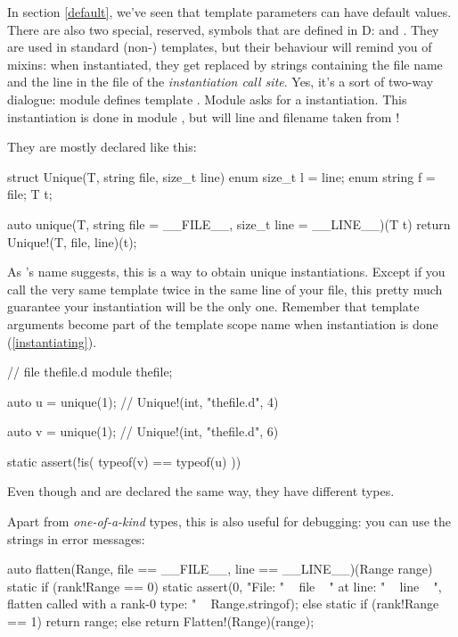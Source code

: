 In section \ref{default}, we've seen that template parameters can have default values. There are also two special, reserved, symbols that are defined in D:  and . They are used in standard (non-) templates, but their behaviour will remind you of mixins: when instantiated, they get replaced by strings containing the file name and the line in the file of the \emph{instantiation call site}. Yes, it's a sort of two-way dialogue: module  defines template . Module  asks for a  instantiation. This instantiation is done in module , but will line and filename taken from !

They are mostly declared like this:

\begin{dcode}
struct Unique(T, string file, size_t line)
{
    enum size_t l = line;
    enum string f = file;
    T t;
}

auto unique(T, string file = __FILE__, size_t line = __LINE__)(T t)
{
    return Unique!(T, file, line)(t);
}
\end{dcode}

As 's name suggests, this is a way to obtain unique instantiations. Except if you call the very same template twice in the same line of your file, this pretty much guarantee your instantiation will be the only one. Remember that template arguments become part of the template scope name when instantiation is done (\ref{instantiating}).

\begin{dcode}
// file thefile.d
module thefile;

auto u = unique(1); // Unique!(int, "thefile.d", 4)

auto v = unique(1); // Unique!(int, "thefile.d", 6)

static assert(!is( typeof(v) == typeof(u) ))
\end{dcode}

Even though  and  are declared the same way, they have different types.

Apart from \emph{one-of-a-kind} types, this is also useful for debugging: you can use the strings in error messages:

\begin{dcode}
auto flatten(Range, file == __FILE__, line == __LINE__)(Range range)
{ 
    static if (rank!Range == 0)
        static assert(0, "File: " ~ file ~ " at line: " ~ line 
                       ~ ", flatten called with a rank-0 type: " 
                       ~ Range.stringof);
    else static if (rank!Range == 1)
        return range;
    else
        return Flatten!(Range)(range);
}
\end{dcode}

